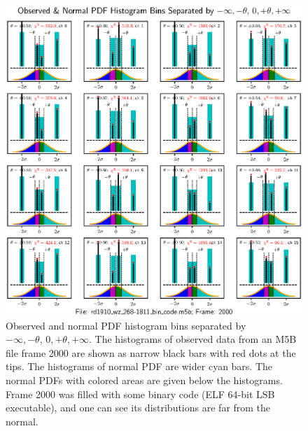 \documentclass[letterpaper,twoside,12pt]{article}
\begin{document}
\begin{figure}[ht!]
  \begin{center}
  \includegraphics[width=35pc]{fig_4x4_Histograms_bin_code_inserted.eps}
  \caption{\small Observed and normal PDF histogram bins separated by $-\infty, -\theta, \, 0, +\theta, +\infty$. The histograms of observed data from an M5B file frame 2000 are shown as narrow black bars with red dots at the tips. The histograms of normal PDF are wider cyan bars. The normal PDFs with colored areas are given below the histograms. Frame 2000 was filled with some binary code (ELF 64-bit LSB executable), and one can see its distributions are far from the normal.}
  \label{hists_bin_code_4x4}
  \end{center}
\end{figure}
\end{document}
